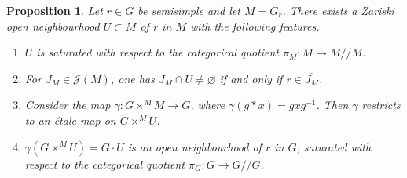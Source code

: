 \documentclass[12pt]{amsart}
\newtheorem{Proposition}[Theorem]{Proposition}
\theoremstyle{definition}
\theoremstyle{remark}
\begin{document}
\begin{Proposition}\label{prop_ACE1}
Let $r \in G$ be semisimple and let $M =G_r$.
There exists a Zariski open neighbourhood $U \subset M$ of $r$ in $M$ with the following features.
\begin{enumerate}[label=(\arabic*)]
\item $U$ is saturated with respect to the categorical quotient $\pi_M \colon M \to M /\!/ M$.
\item For $J_M \in \mathcal{J}(M)$, one has $J_M \cap U \neq \varnothing$ if and only if $r \in \overline{J_M}$.
\item  Consider the map $\gamma \colon G \times^M M \to G$, where $\gamma (g * x) = g x g^{-1}$.
Then $\gamma$ restricts to an \'etale map on $G \times^M U$.
\item $\gamma(G \times^M U) = G \cdot U$ is an open neighbourhood of $r$ in $G$, saturated with respect to the categorical quotient $\pi_G \colon G \to G/\!/G$.
\end{enumerate}
\end{Proposition}
\end{document}
